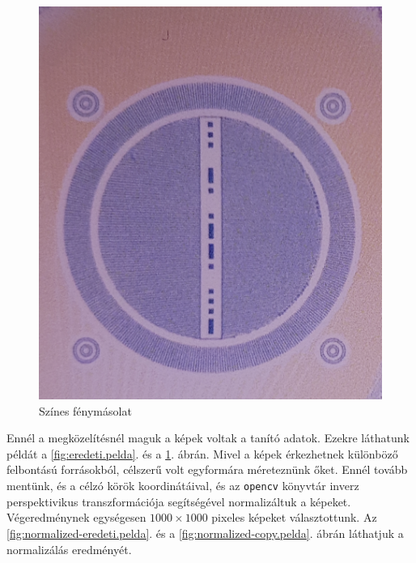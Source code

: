 \begin{figure}[h]
\begin{minipage}[c]{0.5\linewidth}
	\end{minipage}\hfill
	\begin{minipage}[c]{0.5\linewidth}
		\centering
		\includegraphics[width=\textwidth]{img/copy-pelda.png}
		\caption{Színes fénymásolat}
		\label{fig:copy.pelda}
		
	\end{minipage}
	
\end{figure}

Ennél a megközelítésnél maguk a képek voltak a tanító adatok. Ezekre láthatunk példát a  \ref{fig:eredeti.pelda}. és a \ref{fig:copy.pelda}. ábrán.
Mivel a képek érkezhetnek különböző felbontású forrásokból, célszerű volt
egyformára méreteznünk őket. Ennél tovább mentünk, és a célzó körök koordinátáival,
és az \texttt{opencv} könyvtár inverz perspektivikus transzformációja segítségével 
normalizáltuk a képeket. Végeredménynek egységesen $ 1000 \times 1000 $ pixeles képeket
választottunk. Az \ref{fig:normalized-eredeti.pelda}. és a \ref{fig:normalized-copy.pelda}. 
ábrán láthatjuk a normalizálás eredményét.


